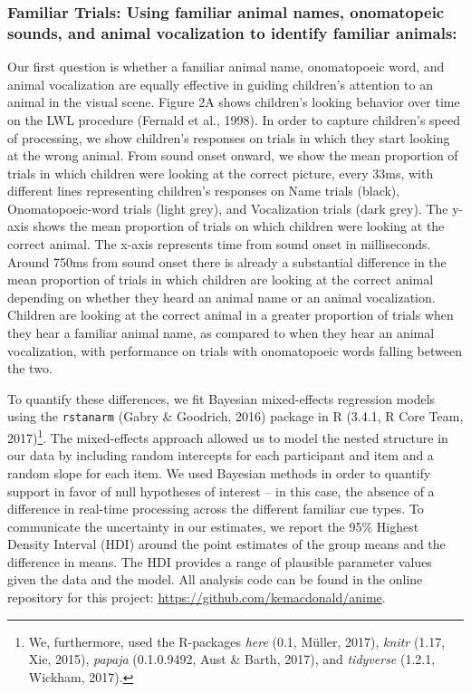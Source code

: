 \documentclass[english,floatsintext,man]{apa6}
\theoremstyle{definition}
\theoremstyle{definition}
\theoremstyle{definition}
\theoremstyle{remark}
\begin{document}
\subsubsection{Familiar Trials: Using familiar animal names, onomatopeic
sounds, and animal vocalization to identify familiar
animals:}\label{familiar-trials-using-familiar-animal-names-onomatopeic-sounds-and-animal-vocalization-to-identify-familiar-animals}

Our first question is whether a familiar animal name, onomatopoeic word,
and animal vocalization are equally effective in guiding children's
attention to an animal in the visual scene. Figure 2A shows children's
looking behavior over time on the LWL procedure (Fernald et al., 1998).
In order to capture children's speed of processing, we show children's
responses on trials in which they start looking at the wrong animal.
From sound onset onward, we show the mean proportion of trials in which
children were looking at the correct picture, every 33ms, with different
lines representing children's responses on Name trials (black),
Onomatopoeic-word trials (light grey), and Vocalization trials (dark
grey). The y-axis shows the mean proportion of trials on which children
were looking at the correct animal. The x-axis represents time from
sound onset in milliseconds. Around 750ms from sound onset there is
already a substantial difference in the mean proportion of trials in
which children are looking at the correct animal depending on whether
they heard an animal name or an animal vocalization. Children are
looking at the correct animal in a greater proportion of trials when
they hear a familiar animal name, as compared to when they hear an
animal vocalization, with performance on trials with onomatopoeic words
falling between the two.

To quantify these differences, we fit Bayesian mixed-effects regression
models using the \texttt{rstanarm} (Gabry \& Goodrich, 2016) package in
R (3.4.1, R Core Team, 2017)\footnote{We, furthermore, used the
  R-packages \emph{here} (0.1, Müller, 2017), \emph{knitr} (1.17, Xie,
  2015), \emph{papaja} (0.1.0.9492, Aust \& Barth, 2017), and
  \emph{tidyverse} (1.2.1, Wickham, 2017).}. The mixed-effects approach
allowed us to model the nested structure in our data by including random
intercepts for each participant and item and a random slope for each
item. We used Bayesian methods in order to quantify support in favor of
null hypotheses of interest -- in this case, the absence of a difference
in real-time processing across the different familiar cue types. To
communicate the uncertainty in our estimates, we report the 95\% Highest
Density Interval (HDI) around the point estimates of the group means and
the difference in means. The HDI provides a range of plausible parameter
values given the data and the model. All analysis code can be found in
the online repository for this project:
\url{https://github.com/kemacdonald/anime}.
\end{document}
